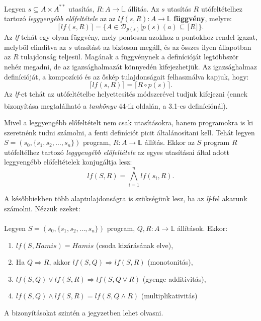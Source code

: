 \documentclass[12pt]{article}
\newcommand{\sut}{$s \subseteq A \times A^{**}$ }
\newcommand{\sprog}{$S = (s_0, \{s_1, s_2, \dots, s_n\})$ }
\begin{document}
\paragraph{}
Legyen \sut utasítás, $R: A \rightarrow \mathbb{L}$ állítás. Az $s$ utasítás $R$ utófeltételhez tartozó \textit{leggyengébb előfeltétele} az az $lf(s,R): A \rightarrow \mathbb{L}$ \textbf{függvény}, melyre:
$$ \lceil lf(s,R) \rceil = \{ A \in \mathcal{D}_{p(s)} | p(s)(a) \subseteq \lceil R \rceil \}. $$
Az \textit{lf} tehát egy olyan függvény, mely pontosan azokhoz a pontokhoz rendel igazat, melyből elindítva az $s$ utasítást az biztosan megáll, és az összes ilyen állapotban az $R$ tulajdonság teljesül. Magának a függvénynek a definícióját legtöbbször nehéz megadni, de az igazsághalmazát könnyedén kifejezhetjük. Az igazsághalmaz definícióját, a kompozíció és az őskép tulajdonságait felhasználva kapjuk, hogy:
$$\lceil lf(s,R)\rceil = \lceil R \circ p(s) \rceil.$$
Az \textit{lf}-et tehát az utófeltételbe helyettesítés módszerével tudjuk kifejezni (ennek bizonyítása megtalálható a \textit{tankönyv}\textsuperscript{\cite{fothi_biblia}} 44-ik oldalán, a 3.1-es definíciónál). 

\par Mivel a leggyengébb előfeltételt nem csak utasításokra, hanem programokra is ki szeretnénk tudni számolni, a fenti definíciót picit általánosítani kell. Tehát legyen \sprog program, $R: A \rightarrow \mathbb{L}$ állítás. Ekkor az $S$ program $R$ utófeltélhez tartozó \textit{leggyengébb előfeltétele} az egyes utasításai által adott leggyengébb előfeltételek konjugáltja lesz:
$$ lf(S, R) = \bigwedge_{i=1}^n lf(s_i, R). $$


A későbbiekben több alaptulajdonságra is szükségünk lesz, ha az \textit{lf}-fel akarunk számolni. Nézzük ezeket:
\paragraph{}
Legyen \sprog program, $Q,R: A \rightarrow \mathbb{L}$ állítások. Ekkor:
\begin{enumerate}
	\item $lf(S, Hamis) = Hamis$ (csoda kizárásának elve),
	\item Ha $Q \Rightarrow R$, akkor $lf(S,Q) \Rightarrow lf(S,R)$ (monotonitás),
	\item $lf(S,Q) \lor lf(S,R) \Rightarrow lf(S, Q\lor R)$ (gyenge additivitás),
	\item $lf(S,Q) \land lf(S,R) = lf(S, Q\land R)$ (multiplikativitás)
\end{enumerate}
A bizonyításokat szintén a jegyzetben lehet olvasni.
\end{document}
